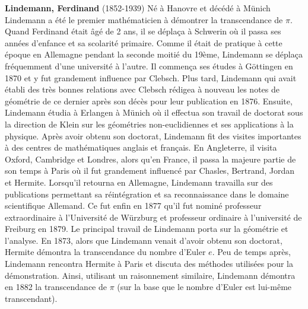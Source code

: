 \textbf{Lindemann, Ferdinand} (1852-1939) Né à Hanovre et décédé à Münich Lindemann a été le premier mathématicien à démontrer la transcendance de $\pi$. Quand Ferdinand était âgé de 2 ans, il se déplaça à Schwerin où il passa ses années d'enfance et sa scolarité primaire. Comme il était de pratique à cette époque en Allemagne pendant la seconde moitié du 19ème, Lindemann se déplaça fréquemment d'une université à l'autre. Il commença ses études à Göttingen en 1870 et y fut grandement influence par Clebsch. Plus tard, Lindemann qui avait établi des très bonnes relations avec Clebsch rédigea à nouveau les notes de géométrie de ce dernier après son décès pour leur publication en 1876. Ensuite, Lindemann étudia à Erlangen à Münich où il effectua son travail de doctorat sous la direction de Klein sur les géométries non-euclidiennes et ses applications à la physique. Après avoir obtenu son doctorat, Lindemann fit des visites importantes à des centres de mathématiques anglais et français. En Angleterre, il visita Oxford, Cambridge et Londres, alors qu'en France, il passa la majeure partie de son temps à Paris où il fut grandement influencé par Chasles, Bertrand, Jordan et Hermite. Lorsqu'il retourna en Allemagne, Lindemann travailla sur des publications permettant sa réintégration et sa reconnaissance dans le domaine scientifique Allemand. Ce fut enfin en 1877 qu'il fut nominé professeur extraordinaire à l'Université de Würzburg et professeur ordinaire à l'université de Freiburg en 1879. Le principal travail de Lindemann porta sur la géométrie et l'analyse. En 1873, alors que Lindemann venait d'avoir obtenu son doctorat, Hermite démontra la transcendance du nombre d'Euler $e$. Peu de temps après, Lindemann rencontra Hermite à Paris et discuta des méthodes utilisées pour la démonstration. Ainsi, utilisant un raisonnement similaire, Lindemann démontra en 1882 la transcendance de $\pi$ (sur la base que le nombre d'Euler est lui-même transcendant).

